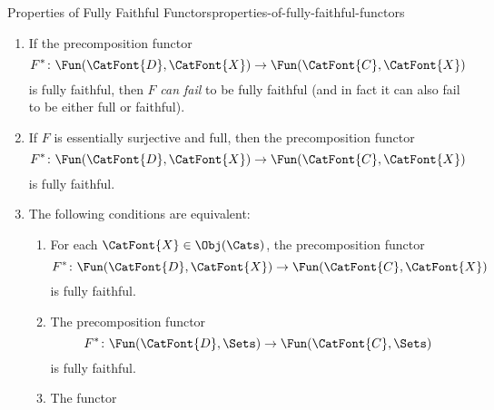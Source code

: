 \begin{proposition}{Properties of Fully Faithful Functors}{properties-of-fully-faithful-functors}
\begin{enumerate}
            \[
                F^{*}
                \colon
                \Fun(\CatFont{D},\CatFont{X})
                \to
                \Fun(\CatFont{C},\CatFont{X})
            \]%
            \emph{can fail} to be fully faithful.
        \item\label{properties-of-fully-faithful-functors-interaction-with-precomposition-2}If the precomposition functor
            \[
                F^{*}
                \colon
                \Fun(\CatFont{D},\CatFont{X})
                \to
                \Fun(\CatFont{C},\CatFont{X})
            \]%
            is fully faithful, then $F$ \emph{can fail} to be fully faithful (and in fact it can also fail to be either full or faithful).
        \item\label{properties-of-fully-faithful-functors-interaction-with-precomposition-3}If $F$ is essentially surjective and full, then the precomposition functor
            \[
                F^{*}
                \colon
                \Fun(\CatFont{D},\CatFont{X})
                \to
                \Fun(\CatFont{C},\CatFont{X})
            \]%
            is fully faithful.
        \item\label{properties-of-fully-faithful-functors-interaction-with-precomposition-4}The following conditions are equivalent:
            \begin{enumerate}
                \item\label{properties-of-fully-faithful-functors-interaction-with-precomposition-4-a}For each $\CatFont{X}\in\Obj(\Cats)$, the precomposition functor
                    \[
                        F^{*}
                        \colon
                        \Fun(\CatFont{D},\CatFont{X})
                        \to
                        \Fun(\CatFont{C},\CatFont{X})
                    \]%
                    is fully faithful.
                \item\label{properties-of-fully-faithful-functors-interaction-with-precomposition-4-b}The precomposition functor
                    \[
                        F^{*}
                        \colon
                        \Fun(\CatFont{D},\Sets)
                        \to
                        \Fun(\CatFont{C},\Sets)
                    \]%
                    is fully faithful.
                \item\label{properties-of-fully-faithful-functors-interaction-with-precomposition-4-c}The functor

\end{enumerate}
\end{enumerate}
\end{proposition}
